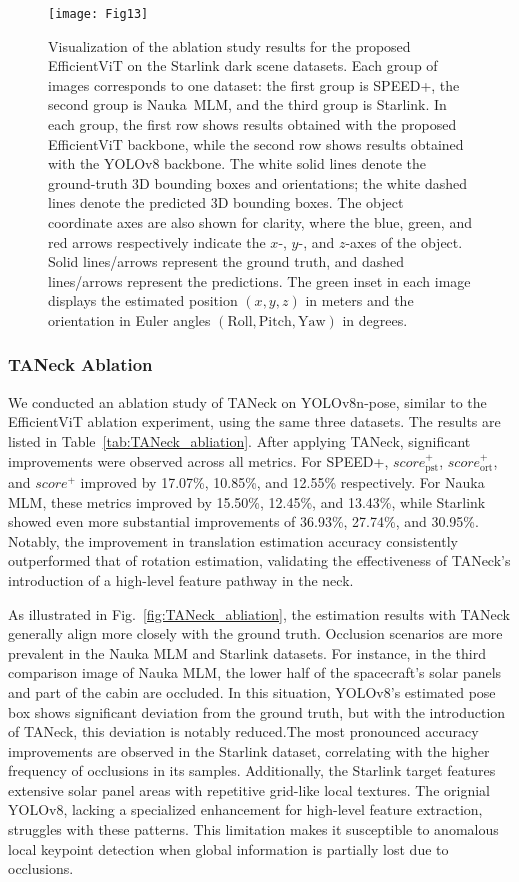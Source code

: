 \documentclass[a4paper,fleqn]{cas-sc}
\begin{document}
\begin{figure}[!htbp]
    \centering
    \texttt{[image: Fig13]}
    \caption{Visualization of the ablation study results for the proposed EfficientViT on the Starlink dark scene datasets. 
    Each group of images corresponds to one dataset: the first group is SPEED+, the second group is Nauka~MLM, and the third group is Starlink. 
    In each group, the first row shows results obtained with the proposed EfficientViT backbone, while the second row shows results obtained with the YOLOv8 backbone. 
    The white solid lines denote the ground-truth 3D bounding boxes and orientations; the white dashed lines denote the predicted 3D bounding boxes. 
    The object coordinate axes are also shown for clarity, where the blue, green, and red arrows respectively indicate the $x$-, $y$-, and $z$-axes of the object. 
    Solid lines/arrows represent the ground truth, and dashed lines/arrows represent the predictions. 
    The green inset in each image displays the estimated position $(x,y,z)$ in meters and the orientation in Euler angles $(\mathrm{Roll}, \mathrm{Pitch}, \mathrm{Yaw})$ in degrees.}
    \label{fig:dark_scene_comp}
\end{figure}


\subsubsection{TANeck Ablation}
We conducted an ablation study of TANeck on YOLOv8n-pose, similar to the EfficientViT ablation experiment, using the same three datasets. The results are listed in Table~\ref{tab:TANeck_abliation}. After applying TANeck, significant improvements were observed across all metrics. For SPEED+, $score_{\text{pst}}^+$, $score_{\text{ort}}^+$, and $score^+$ improved by 17.07\%, 10.85\%, and 12.55\% respectively. For Nauka MLM, these metrics improved by 15.50\%, 12.45\%, and 13.43\%, while Starlink showed even more substantial improvements of 36.93\%, 27.74\%, and 30.95\%. Notably, the improvement in translation estimation accuracy consistently outperformed that of rotation estimation, validating the effectiveness of TANeck's introduction of a high-level feature pathway in the neck.

As illustrated in Fig.~\ref{fig:TANeck_abliation}, the estimation results with TANeck generally align more closely with the ground truth. Occlusion scenarios are more prevalent in the Nauka MLM and Starlink datasets. For instance, in the third comparison image of Nauka MLM, the lower half of the spacecraft's solar panels and part of the cabin are occluded. In this situation, YOLOv8's estimated pose box shows significant deviation from the ground truth, but with the introduction of TANeck, this deviation is notably reduced.The most pronounced accuracy improvements are observed in the Starlink dataset, correlating with the higher frequency of occlusions in its samples. Additionally, the Starlink target features extensive solar panel areas with repetitive grid-like local textures. The orignial YOLOv8, lacking a specialized enhancement for high-level feature extraction, struggles with these patterns. This limitation makes it susceptible to anomalous local keypoint detection when global information is partially lost due to occlusions.
\end{document}
